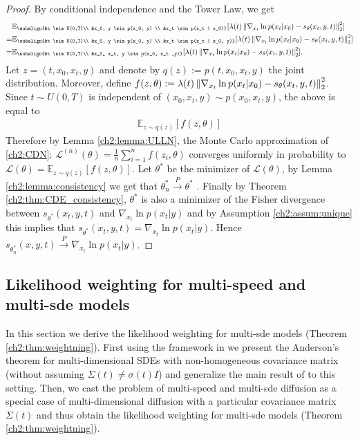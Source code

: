 \begin{proof}
    By conditional independence and the Tower Law, we get
    \begin{align*}
         &\mathbb{E}_{\subalign{&t \sim U(0,T)\\ &x_0, y \sim p(x_0, y) \\ &x_t \sim p(x_t | x_0)}} 
                [\lambda(t) \norm{\nabla_{x_t} \ln{p(x_t | x_0)} - s_\theta(x_t, y, t)}_2^2] \\
        =& \mathbb{E}_{\subalign{&t \sim U(0,T)\\ &x_0, y \sim p(x_0, y) \\ &x_t \sim p(x_t | x_0, y)}} 
            [\lambda(t) \norm{\nabla_{x_t} \ln{p(x_t | x_0)} - s_\theta(x_t, y, t)}_2^2] \\
        =& \mathbb{E}_{\subalign{&t \sim U(0,T)\\ &x_0,, x_t, y \sim p(x_0, x_t ,y)}} 
            [\lambda(t) \norm{\nabla_{x_t} \ln{p(x_t | x_0)} - s_\theta(x_t, y, t)}_2^2].
    \end{align*}
    Let $z=(t,x_0,x_t,y)$ and denote by $q(z):=p(t,x_0,x_t,y)$ the joint distribution. Moreover, define $f(z,\theta) := \lambda(t) \left\lVert \nabla_{x_t} \ln{p(x_t | x_0)} - s_\theta(x_t, y, t) \right\rVert_2^2$. Since $t \sim U(0,T)$ is independent of $(x_0, x_t ,y) \sim p(x_0, x_t ,y)$, the above is equal to 
    \begin{align*}
        \mathbb{E}_{z \sim q(z)} 
            [f(z,\theta)]
    \end{align*}
    Therefore by Lemma \ref{ch2:lemma:ULLN}, the Monte Carlo approximation of \ref{ch2:CDN}: $\mathcal{L}^{(n)}(\theta)=\frac{1}{n}\sum_{i=1}^n f(z_i, \theta)$ converges uniformly in probability to $\mathcal{L}(\theta) = \mathbb{E}_{z \sim q(z)} 
    [f(z,\theta)]$. Let $\theta^\ast$ be the minimizer of $\mathcal{L}(\theta)$, by Lemma \ref{ch2:lemma:consistency} we get that $\theta^\ast_n \overset{P}{\to} \theta^\ast$ . Finally by Theorem \ref{ch2:thm:CDE_consistency}, $\theta^\ast$ is also a minimizer of the Fisher divergence between $s_{\theta^\ast}(x_t,y,t)$ and $\nabla_{x_t} \ln p(x_t | y)$ and by Assumption \ref{ch2:assum:unique} this implies that $s_{\theta^\ast}(x_t,y,t) = \nabla_{x_t} \ln p(x_t | y)$. Hence $s_{\theta_n^\ast}(x,y,t) \overset{P}{\to} \nabla_{x_t} \ln p(x_t | y)$.
\end{proof}

\subsection{Likelihood weighting for multi-speed and multi-sde models}
\label{ch2:appendix:weighting}
In this section we derive the likelihood weighting for multi-sde models (Theorem \ref{ch2:thm:weightning}). First using the framework in \cite[Appendix A]{song2021sde} we present the Anderson's theorem for multi-dimensional SDEs with non-homogeneous covariance matrix (without assuming $\Sigma(t) \not = \sigma(t) I$) and generalize the main result of \cite{song2021maximum} to this setting. Then, we cast the problem of multi-speed and  multi-sde diffusion as a special case of multi-dimensional diffusion with a particular covariance matrix $\Sigma(t)$ and thus obtain the likelihood weighting for multi-sde models (Theorem \ref{ch2:thm:weightning}).

